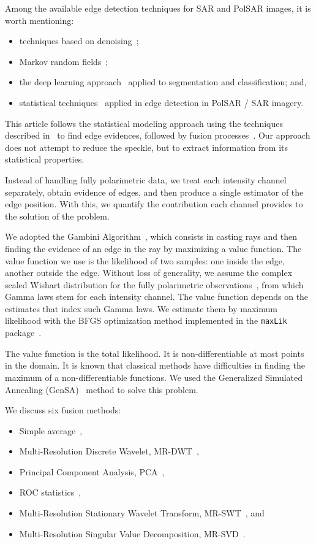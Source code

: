 \documentclass[journal]{IEEEtran}
\begin{document}
Among the available edge detection techniques for SAR and PolSAR images, it is worth mentioning:
\begin{itemize}
\item techniques based on denoising~\cite{sjx, lzly, wxbzw, law, cgaf};   
\item Markov random fields~\cite{bf};	
\item the deep learning approach~\cite{bac, ztmxzxf} applied to segmentation and classification; and,
\item statistical techniques~\cite{gmbf, fbgm, nhfc} applied in edge detection in PolSAR / SAR imagery.
\end{itemize}

This article follows the statistical modeling approach using the techniques described in~\cite{gmbf, fbgm, nhfc} to find edge evidences, followed by fusion processes~\cite{mit, bmf_2019}. 
Our approach does not attempt to reduce the speckle, but to extract information from its statistical properties.

Instead of handling fully polarimetric data, we treat each intensity channel separately, obtain evidence of edges, and then produce a single estimator of the edge position.
With this, we quantify the contribution each channel provides to the solution of the problem.

We adopted the Gambini Algorithm~\cite{gmbf_sc}, which consists in casting rays and then finding the evidence of an edge in the ray by maximizing a value function.
The value function we use is the likelihood of two samples: one inside the edge, another outside the edge.
Without loss of generality, we assume the complex scaled Wishart distribution for the fully polarimetric observations~\cite{ade}, from which Gamma laws stem for each intensity channel.
The value function depends on the estimates that index such Gamma laws.
We estimate them by maximum likelihood with the BFGS optimization method implemented in the \texttt{maxLik} package~\cite{ht}.

The value function is the total likelihood.
It is non-differentiable at most points in the domain. 
It is known that classical methods have difficulties in finding the maximum of a non-differentiable functions. 
We used the Generalized Simulated Annealing (GenSA)~\cite{xgsh} method to solve this problem. 

We discuss six fusion methods:
\begin{itemize}
\item Simple average~\cite{mit}, 
\item Multi-Resolution Discrete Wavelet, MR-DWT~\cite{n_r},
\item Principal Component Analysis, PCA~\cite{n_r,mit},
\item ROC statistics~\cite{gs,fawcett},
\item Multi-Resolution Stationary Wavelet Transform, MR-SWT~\cite{n_r, jjly}, and 
\item Multi-Resolution Singular Value Decomposition, MR-SVD~\cite{naidu}.
\end{itemize}
\end{document}
